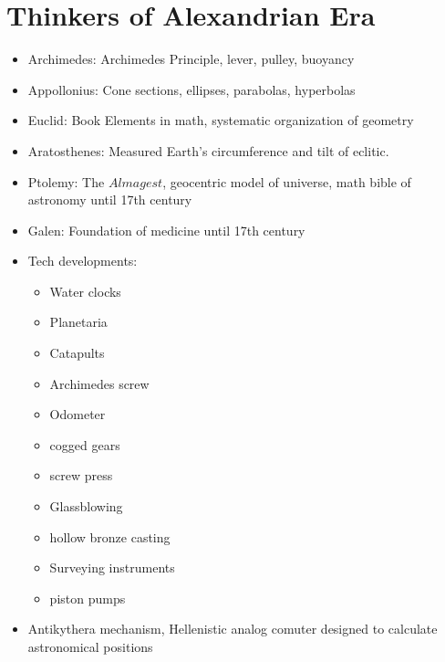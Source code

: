 \documentclass{article}
\begin{document}
\section*{Thinkers of Alexandrian Era}
\begin{itemize}
  \item Archimedes: Archimedes Principle, lever, pulley, buoyancy
  \item Appollonius: Cone sections, ellipses, parabolas, hyperbolas
  \item Euclid: Book Elements in math, systematic organization of geometry
  \item Aratosthenes: Measured Earth's circumference and tilt of eclitic.
  \item Ptolemy: The $Almagest$, geocentric model of universe, math bible of astronomy
    until 17th century
  \item Galen: Foundation of medicine until 17th century
  \item Tech developments:
    \begin{itemize}
      \item Water clocks
      \item Planetaria
      \item Catapults
      \item Archimedes screw
      \item Odometer
      \item cogged gears
      \item screw press
      \item Glassblowing
      \item hollow bronze casting
      \item Surveying instruments
      \item piston pumps
    \end{itemize}
  \item Antikythera mechanism, Hellenistic analog comuter designed
    to calculate astronomical positions
\end{itemize}
\end{document}

